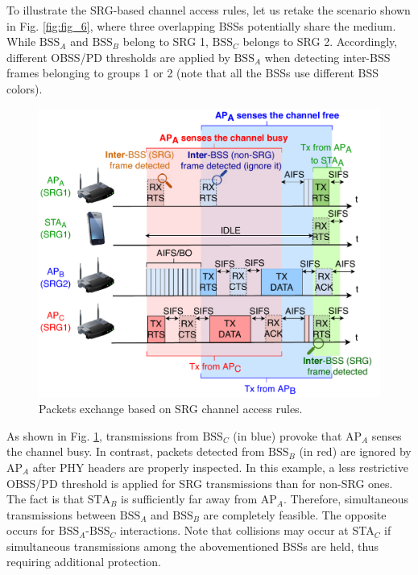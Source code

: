 \documentclass{ieeeaccess}
\begin{document}
To illustrate the SRG-based channel access rules, let us retake the scenario shown in Fig. \ref{fig:fig_6}, where three overlapping BSSs potentially share the medium. While $\text{BSS}_A$ and $\text{BSS}_B$ belong to SRG 1, $\text{BSS}_C$ belongs to SRG 2. Accordingly, different OBSS/PD thresholds are applied by $\text{BSS}_A$ when detecting inter-BSS frames belonging to groups 1 or 2 (note that all the BSSs use different BSS colors).

\begin{figure}[ht!]
	\centering
	\includegraphics[width=\columnwidth]{fig_7}
	\caption{Packets exchange based on SRG channel access rules.}
	\label{fig:srg_channel_access}
\end{figure} 

As shown in Fig. \ref{fig:srg_channel_access}, transmissions from $\text{BSS}_C$ (in blue) provoke that $\text{AP}_A$ senses the channel busy. In contrast, packets detected from $\text{BSS}_B$ (in red) are ignored by $\text{AP}_A$ after PHY headers are properly inspected. In this example, a less restrictive OBSS/PD threshold is applied for SRG transmissions than for non-SRG ones. The fact is that $\text{STA}_B$ is sufficiently far away from $\text{AP}_A$. Therefore, simultaneous transmissions between $\text{BSS}_A$ and $\text{BSS}_B$ are completely feasible. The opposite occurs for $\text{BSS}_A$-$\text{BSS}_C$ interactions. Note that collisions may occur at STA$_C$ if simultaneous transmissions among the abovementioned BSSs are held, thus requiring additional protection.
\end{document}
